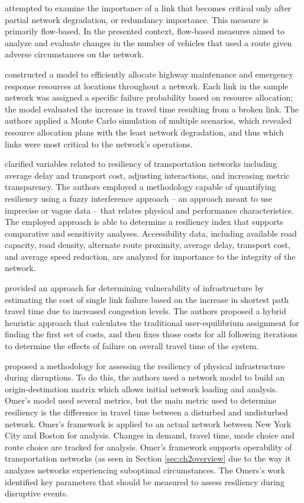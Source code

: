\citet{Jenelius2010} attempted to examine the importance of a link that
becomes critical only after partial network degradation, or redundancy
importance. This measure is primarily flow-based. In the presented context,
flow-based measures aimed to analyze and evaluate changes in the number of
vehicles that used a route given adverse circumstances on the network.

\citet{peeta2010} constructed a model to efficiently allocate
highway maintenance and emergency response resources at locations throughout a
network. Each link in the sample network was
assigned a specific failure probability based on resource allocation;
the model evaluated the increase in travel time resulting from a broken
link. The authors applied a Monte Carlo simulation of multiple scenarios,
which revealed resource allocation plans with the least network degradation,
and thus which links were most critical to the network's operations.

\citet{serulle2011} clarified variables related to resiliency
of transportation networks including average delay and transport cost,
adjusting interactions,
and increasing metric transparency. The authors employed a methodology
capable of quantifying
resiliency using a fuzzy interference approach – an approach meant to use
imprecise or vague data
– that relates physical and performance characteristics. The employed approach
is able to determine a
resiliency index that supports comparative and sensitivity analyses.
Accessibility data, including
available road capacity, road density, alternate route proximity, average
delay, transport cost,
and average speed reduction, are analyzed for importance to the integrity
of the network.

\citet{ibrahim2011} provided an approach for determining
vulnerability of infrastructure by estimating the cost of single link
failure based on the increase in shortest path travel time due to
increased congestion
levels. The authors proposed a hybrid heuristic approach that calculates the
traditional user-equilibrium assignment for finding the first set of
costs, and
then fixes those costs for all following iterations to determine the
effects of
failure on overall travel time of the system.

\citet{omer2013} proposed a methodology for assessing the resiliency of
physical infrastructure
during disruptions. To do this, the authors used a network model to build
an origin-destination
matrix which allows initial network loading and analysis. Omer’s model used
several metrics, but
the main metric used to determine resiliency is the difference in travel
time between a disturbed
and undisturbed network. Omer’s framework is applied to an actual network
between New York City
and Boston for analysis. Changes in demand, travel time, mode choice and
route choice are tracked
for analysis. Omer’s framework supports operability of transportation
networks (as seen in Section \ref{sec:ch2overview} due to the way it
analyzes networks experiencing suboptimal circumstances. The Omers's work
identified key
parameters that should be measured to assess resiliency during disruptive
events.

